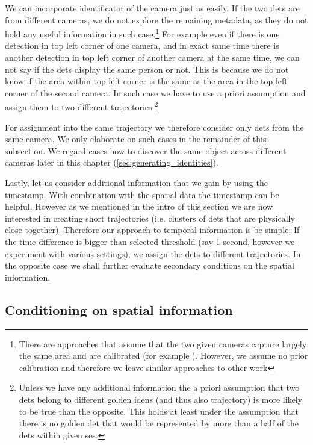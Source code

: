 We can incorporate identificator of the camera just as easily. If the two
\glspl{det} are from different cameras, we do not explore the remaining
metadata, as they do not hold any useful information in such
case.\footnote{There
are approaches that assume that the two given cameras capture largely the same
area and are calibrated (for example \cite{hu2006principal}). However, we
assume no prior calibration and therefore we leave similar approaches to other
work} For example even if there is one detection in top left corner of one
camera, and in exact same time there is another detection in top left corner
of another camera at the same time, we can not say if the \glspl{det}
display the same person or not. This is
because we do not know if the area within top left corner is the same as the
area in the top left corner of the second camera. In such case we have to use
a priori assumption and assign them to two different
trajectories.\footnote{Unless we have any additional information the a priori
assumption that two \glspl{det} belong to different golden \glspl{iden} (and thus also trajectory) is more
likely to be true than the opposite. This holds at least under the assumption that there is no
golden \gls{det} that would be represented by more than a half of the
\glspl{det} within given \gls{ses}.}

For assignment into the same trajectory we therefore consider only \glspl{det}
from the same camera. We only elaborate on such cases in the remainder
of this subsection. We regard cases how to discover the same object across
different cameras later in this chapter (\autoref{sec:generating_identities}).

Lastly, let us consider additional information that we gain by using the timestamp.
With combination with the spatial data the timestamp can be helpful. However as
we mentioned in the intro of this section
we are now interested in creating short trajectories (i.e. clusters of
\glspl{det} that are physically close together). Therefore
our approach to temporal information is be simple: If the time difference is
bigger than selected threshold (say 1 second, however we experiment with
various settings), we assign the \glspl{det} to different trajectories. In the
opposite case we shall further evaluate secondary conditions on the spatial
information.

\subsection{Conditioning on spatial information}

